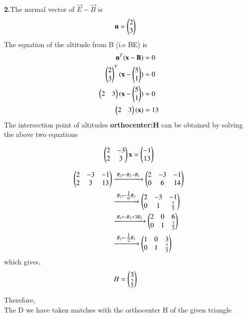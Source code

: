\documentclass[journal]{IEEEtran}
\begin{document}
\textbf{2.}The normal vector of    $\vec{E}-\vec{B}$ is\\ 
\begin{align}
\mathbf{n}&=\begin{pmatrix}2\\3\end{pmatrix}
\end{align}
The equation of the altitude from B (i.e BE) is
\begin{align}
\mathbf{n}^{T}(\mathbf{x-B})&=0\\
\begin{pmatrix}2\\3\end{pmatrix}^{T}(\mathbf{x}-\begin{pmatrix}5\\1\end{pmatrix})&=0\\
\begin{pmatrix}2&3\end{pmatrix}(\mathbf{x}-\begin{pmatrix}5\\1\end{pmatrix})&=0\\
\begin{pmatrix}2&3\end{pmatrix}(\mathbf{x})&=13\\
\end{align}
The intersection point of altitudes \textbf{orthocenter:H} can be obtained by solving the above two equations

\begin{align}
\begin{pmatrix}2 & -3 \\ 2 & 3\end{pmatrix}\mathbf{x} = \begin{pmatrix}-1 \\ 13\end{pmatrix}
\end{align}

\begin{align}
\begin{pmatrix}2 & -3 & -1 \\ 2 & 3 & 13\end{pmatrix}
&\xrightarrow{\;R_2 \gets R_2 - R_1\;}
\begin{pmatrix}2 & -3 & -1 \\ 0 & 6 & 14\end{pmatrix} \\
&\xrightarrow{\;R_2 \gets \tfrac{1}{6}R_2\;}
\begin{pmatrix}2 & -3 & -1 \\ 0 & 1 & \tfrac{7}{3}\end{pmatrix} \\
&\xrightarrow{\;R_1 \gets R_1 + 3R_2\;}
\begin{pmatrix}2 & 0 & 6 \\ 0 & 1 & \tfrac{7}{3}\end{pmatrix} \\
&\xrightarrow{\;R_1 \gets \tfrac{1}{2}R_1\;}
\begin{pmatrix}1 & 0 & 3 \\ 0 & 1 & \tfrac{7}{3}\end{pmatrix}
\end{align}
which gives,
\begin{align}
H&=\begin{pmatrix}3\\\tfrac{7}{3}\end{pmatrix}
\end{align}

Therefore,\\
The D we have taken matches with the orthocenter H of the given triangle
\end{document}

